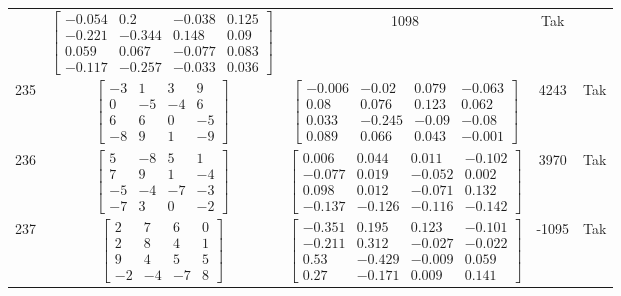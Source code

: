 \documentclass[a4paper,12pt]{article}
\begin{document}
\begin{tabular}{c c c c c}
&
$\begin{bmatrix} -0.054 & 0.2 & -0.038 & 0.125 \\ -0.221 & -0.344 & 0.148 & 0.09 \\ 0.059 & 0.067 & -0.077 & 0.083 \\ -0.117 & -0.257 & -0.033 & 0.036 \end{bmatrix}$
&
1098
&
Tak
\\
235
&
$\begin{bmatrix} -3 & 1 & 3 & 9 \\ 0 & -5 & -4 & 6 \\ 6 & 6 & 0 & -5 \\ -8 & 9 & 1 & -9 \end{bmatrix}$
&
$\begin{bmatrix} -0.006 & -0.02 & 0.079 & -0.063 \\ 0.08 & 0.076 & 0.123 & 0.062 \\ 0.033 & -0.245 & -0.09 & -0.08 \\ 0.089 & 0.066 & 0.043 & -0.001 \end{bmatrix}$
&
4243
&
Tak
\\
236
&
$\begin{bmatrix} 5 & -8 & 5 & 1 \\ 7 & 9 & 1 & -4 \\ -5 & -4 & -7 & -3 \\ -7 & 3 & 0 & -2 \end{bmatrix}$
&
$\begin{bmatrix} 0.006 & 0.044 & 0.011 & -0.102 \\ -0.077 & 0.019 & -0.052 & 0.002 \\ 0.098 & 0.012 & -0.071 & 0.132 \\ -0.137 & -0.126 & -0.116 & -0.142 \end{bmatrix}$
&
3970
&
Tak
\\
237
&
$\begin{bmatrix} 2 & 7 & 6 & 0 \\ 2 & 8 & 4 & 1 \\ 9 & 4 & 5 & 5 \\ -2 & -4 & -7 & 8 \end{bmatrix}$
&
$\begin{bmatrix} -0.351 & 0.195 & 0.123 & -0.101 \\ -0.211 & 0.312 & -0.027 & -0.022 \\ 0.53 & -0.429 & -0.009 & 0.059 \\ 0.27 & -0.171 & 0.009 & 0.141 \end{bmatrix}$
&
-1095
&
Tak
\\

\end{tabular}
\end{document}
